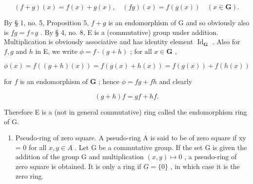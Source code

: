 \[
(f + g) (x) = f (x) + g (x), \quad (f g) (x) = f (g (x)) \quad (x \in \mathbf {G}).
\]

By § 1, no. 5, Proposition 5, \(f + g\) is an endomorphism of G and so obviously also is \(fg = f \circ g\) . By § 4, no. 8, E is a (commutative) group under addition. Multiplication is obviously associative and has identity element \(\operatorname{Id}_{\mathbf{G}}\) . Also for \(f, g\) and \(h\) in E, we write \(\phi = f \cdot (g + h)\) ; for all \(x \in \mathbf{G}\) ,

\[
\phi (x) = f ((g + h) (x)) = f (g (x) + h (x)) = f (g (x)) + f (h (x))
\]

for \(f\) is an endomorphism of \(\mathbf{G}\) ; hence \(\phi = fg + fh\) and clearly

\[
(g + h) f = g f + h f.
\]

Therefore E is a (not in general commutative) ring called the endomorphism ring of G.

\begin{enumerate}
\def\labelenumi{\Roman{enumi}.}
\setcounter{enumi}{6}
\tightlist
\item
  Pseudo-ring of zero square. A pseudo-ring A is said to be of zero square if xy = 0 for all \(x, y \in A\) . Let G be a commutative group. If the set G is given the addition of the group G and multiplication \((x, y) \mapsto 0\) , a pseudo-ring of zero square is obtained. It is only a ring if \(G = \{0\}\) , in which case it is the zero ring.
\end{enumerate}

